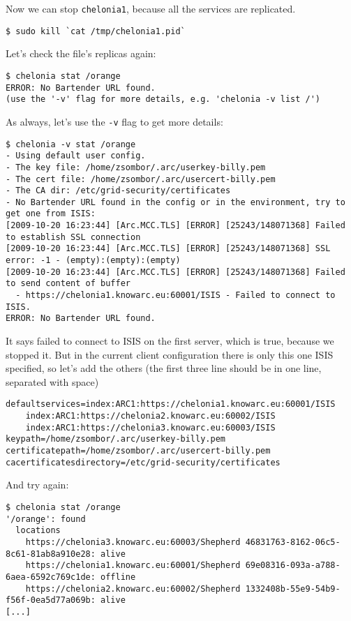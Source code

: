 \documentclass{article}
\begin{document}
Now we can stop \verb!chelonia1!, because all the services are replicated.

\begin{verbatim}
$ sudo kill `cat /tmp/chelonia1.pid`
\end{verbatim}

Let's check the file's replicas again:

\begin{verbatim}
$ chelonia stat /orange
ERROR: No Bartender URL found.
(use the '-v' flag for more details, e.g. 'chelonia -v list /')
\end{verbatim}

As always, let's use the \verb!-v! flag to get more details:

\begin{verbatim}
$ chelonia -v stat /orange
- Using default user config.
- The key file: /home/zsombor/.arc/userkey-billy.pem
- The cert file: /home/zsombor/.arc/usercert-billy.pem
- The CA dir: /etc/grid-security/certificates
- No Bartender URL found in the config or in the environment, try to get one from ISIS:
[2009-10-20 16:23:44] [Arc.MCC.TLS] [ERROR] [25243/148071368] Failed to establish SSL connection
[2009-10-20 16:23:44] [Arc.MCC.TLS] [ERROR] [25243/148071368] SSL error: -1 - (empty):(empty):(empty)
[2009-10-20 16:23:44] [Arc.MCC.TLS] [ERROR] [25243/148071368] Failed to send content of buffer
  - https://chelonia1.knowarc.eu:60001/ISIS - Failed to connect to ISIS.
ERROR: No Bartender URL found.
\end{verbatim}

It says failed to connect to ISIS on the first server, which is true, because we stopped it. But in the current client configuration there is only this one ISIS specified, so let's add the others (the first three line should be in one line, separated with space)

\begin{verbatim}
defaultservices=index:ARC1:https://chelonia1.knowarc.eu:60001/ISIS
    index:ARC1:https://chelonia2.knowarc.eu:60002/ISIS
    index:ARC1:https://chelonia3.knowarc.eu:60003/ISIS
keypath=/home/zsombor/.arc/userkey-billy.pem
certificatepath=/home/zsombor/.arc/usercert-billy.pem
cacertificatesdirectory=/etc/grid-security/certificates
\end{verbatim}

And try again:

\begin{verbatim}
$ chelonia stat /orange
'/orange': found
  locations
    https://chelonia3.knowarc.eu:60003/Shepherd 46831763-8162-06c5-8c61-81ab8a910e28: alive
    https://chelonia1.knowarc.eu:60001/Shepherd 69e08316-093a-a788-6aea-6592c769c1de: offline
    https://chelonia2.knowarc.eu:60002/Shepherd 1332408b-55e9-54b9-f56f-0ea5d77a069b: alive
[...]
\end{verbatim}
\end{document}
